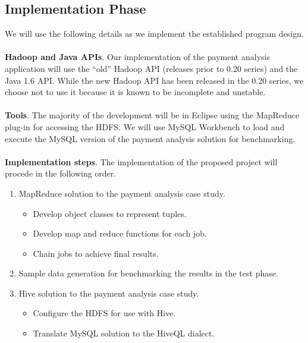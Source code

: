 \documentclass[letterpaper,12pt,titlepage]{article}
\begin{document}
\subsection{Implementation Phase}
We will use the following details as we implement the established program
design.
\\\\
\textbf{Hadoop and Java APIs}. Our implementation of the payment analysis
application will use the ``old'' Hadoop API (releases prior to
0.20 series) and the Java 1.6 API. While the new Hadoop API has been released in
the 0.20 series, we choose not to use it because it is known to be incomplete
and unstable.
\\\\
\textbf{Tools}. The majority of the development will be in Eclipse using
the MapReduce plug-in for accessing the HDFS. We will use MySQL Workbench to
load and execute the MySQL version of the payment analysis solution for
benchmarking.
\\\\
\textbf{Implementation steps}. The implementation of the proposed project
will procede in the following order.
\begin{enumerate}
  \item MapReduce solution to the payment analysis case study.
    \begin{itemize}
     \item Develop object classes to represent tuples.
     \item Develop map and reduce functions for each job.
     \item Chain jobs to achieve final results.
    \end{itemize}
  \item Sample data generation for benchmarking the results in the test phase.
  \item Hive solution to the payment analysis case study. 
    \begin{itemize}
      \item Configure the HDFS for use with Hive.
      \item Translate MySQL solution to the HiveQL dialect.
    \end{itemize}
\end{enumerate}
\end{document}
